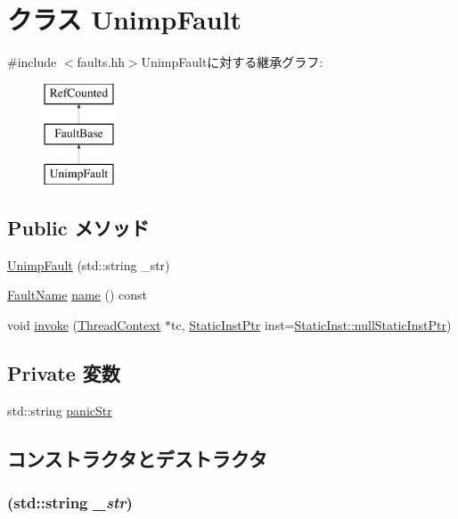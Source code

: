 \hypertarget{classUnimpFault}{
\section{クラス UnimpFault}
\label{classUnimpFault}
}


{\ttfamily \#include $<$faults.hh$>$}UnimpFaultに対する継承グラフ:\begin{figure}[H]
\begin{center}
\leavevmode
\includegraphics[height=3cm]{classUnimpFault}
\end{center}
\end{figure}
\subsection*{Public メソッド}
\begin{DoxyCompactItemize}
\item 
\hyperlink{classUnimpFault_ab16b118e132981c95785f1b10a9d4775}{UnimpFault} (std::string \_\-str)
\item 
\hyperlink{sim_2faults_8hh_abb196df64725e5c2568c900cf130d8d7}{FaultName} \hyperlink{classUnimpFault_a73adb23259baf912a81683a9790a303f}{name} () const 
\item 
void \hyperlink{classUnimpFault_a2bd783b42262278d41157d428e1f8d6f}{invoke} (\hyperlink{classThreadContext}{ThreadContext} $\ast$tc, \hyperlink{classRefCountingPtr}{StaticInstPtr} inst=\hyperlink{classStaticInst_aa793d9793af735f09096369fb17567b6}{StaticInst::nullStaticInstPtr})
\end{DoxyCompactItemize}
\subsection*{Private 変数}
\begin{DoxyCompactItemize}
\item 
std::string \hyperlink{classUnimpFault_ada384d45bbfeffe352f997821b8f6d2b}{panicStr}
\end{DoxyCompactItemize}


\subsection{コンストラクタとデストラクタ}
\hypertarget{classUnimpFault_ab16b118e132981c95785f1b10a9d4775}{
\subsubsection[{UnimpFault}]{ (std::string {\em \_\-str})}}
\label{classUnimpFault_ab16b118e132981c95785f1b10a9d4775}



